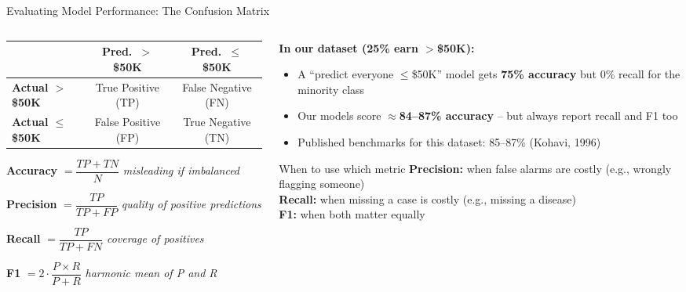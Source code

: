 \documentclass[aspectratio=169, 10pt]{beamer}
\begin{document}
\begin{frame}{Evaluating Model Performance: The Confusion Matrix}
\begin{columns}[T]
\begin{column}{0.52\textwidth}
\vspace{0.2em}
\small
\renewcommand{\arraystretch}{1.35}
\begin{tabular}{l|cc}
 & \textbf{Pred.\ $>$\$50K} & \textbf{Pred.\ $\leq$\$50K} \\
\hline
\textbf{Actual $>$\$50K} & \cellcolor{green!15}True Positive (TP) & \cellcolor{red!12}False Negative (FN) \\
\textbf{Actual $\leq$\$50K} & \cellcolor{red!12}False Positive (FP) & \cellcolor{green!15}True Negative (TN) \\
\end{tabular}

\vspace{0.7em}
\small
\textbf{Accuracy} $= \dfrac{TP + TN}{N}$ \hfill \textit{misleading if imbalanced}

\vspace{0.35em}
\textbf{Precision} $= \dfrac{TP}{TP + FP}$ \hfill \textit{quality of positive predictions}

\vspace{0.35em}
\textbf{Recall} $= \dfrac{TP}{TP + FN}$ \hfill \textit{coverage of positives}

\vspace{0.35em}
\textbf{F1} $= 2 \cdot \dfrac{P \times R}{P + R}$ \hfill \textit{harmonic mean of P and R}
\end{column}

\begin{column}{0.45\textwidth}
\textbf{In our dataset (25\% earn $>$\$50K):}
\begin{itemize}
  \setlength\itemsep{0.3em}
  \item A ``predict everyone $\leq$\$50K'' model gets \textbf{75\% accuracy} but 0\% recall for the minority class
  \item Our models score $\approx$\textbf{84--87\% accuracy} -- but always report recall and F1 too
  \item Published benchmarks for this dataset: 85--87\% (Kohavi, 1996)
\end{itemize}

\vspace{0.4em}
\begin{alertblock}{When to use which metric}
\textbf{Precision:} when false alarms are costly (e.g., wrongly flagging someone)\\
\textbf{Recall:} when missing a case is costly (e.g., missing a disease)\\
\textbf{F1:} when both matter equally
\end{alertblock}
\end{column}
\end{columns}
\end{frame}
\end{document}
